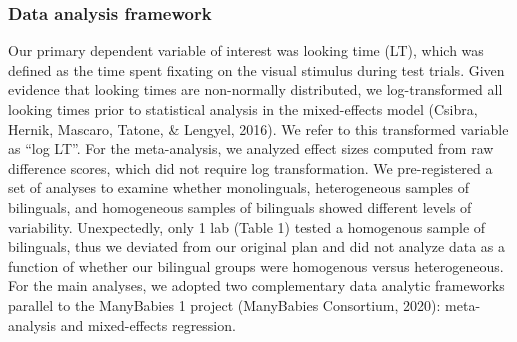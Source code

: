 \documentclass[
  english,
  ,man,floatsintext]{apa6}
\begin{document}
\hypertarget{data-analysis-framework}{%
\subsubsection{Data analysis framework}\label{data-analysis-framework}}

Our primary dependent variable of interest was looking time (LT), which was defined as the time spent fixating on the visual stimulus during test trials. Given evidence that looking times are non-normally distributed, we log-transformed all looking times prior to statistical analysis in the mixed-effects model (Csibra, Hernik, Mascaro, Tatone, \& Lengyel, 2016). We refer to this transformed variable as \enquote{log LT}. For the meta-analysis, we analyzed effect sizes computed from raw difference scores, which did not require log transformation. We pre-registered a set of analyses to examine whether monolinguals, heterogeneous samples of bilinguals, and homogeneous samples of bilinguals showed different levels of variability. Unexpectedly, only 1 lab (Table 1) tested a homogenous sample of bilinguals, thus we deviated from our original plan and did not analyze data as a function of whether our bilingual groups were homogenous versus heterogeneous. For the main analyses, we adopted two complementary data analytic frameworks parallel to the ManyBabies 1 project (ManyBabies Consortium, 2020): meta-analysis and mixed-effects regression.
\end{document}
